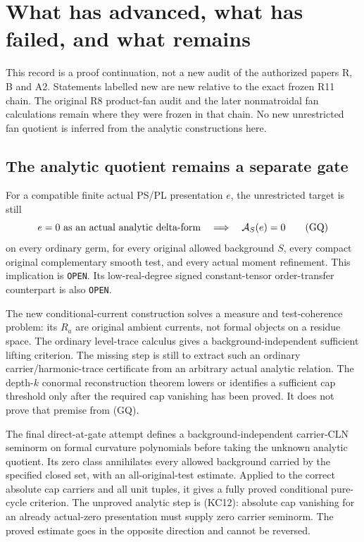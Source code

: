 \documentclass[11pt,a4paper]{article}
\numberwithin{equation}{section}
\theoremstyle{definition}
\theoremstyle{remark}
\begin{document}


\section{What has advanced, what has failed, and what remains}
\label{sec:r12-final-status}

This record is a proof continuation, not a new audit of the
authorized papers R, B and A2. Statements labelled new are new
relative to the exact frozen R11 chain. The original R8 product-fan
audit and the later nonmatroidal fan calculations remain where
they were frozen in that chain. No new unrestricted fan quotient
is inferred from the analytic constructions here.

\subsection{The analytic quotient remains a separate gate}

For a compatible finite actual PS/PL presentation $e$, the
unrestricted target is still
\[
 e=0\ \hbox{as an actual analytic delta-form}
       \quad\Longrightarrow\quad \mathcal A_S(e)=0
 \tag{GQ}
\]
on every ordinary germ, for every original allowed background $S$,
every compact original complementary smooth test, and every actual
moment refinement. This implication is \texttt{OPEN}. Its
low-real-degree signed constant-tensor order-transfer counterpart
is also \texttt{OPEN}.

The new conditional-current construction solves a measure and
test-coherence problem: its $R_a$ are original ambient currents,
not formal objects on a residue space. The ordinary level-trace
calculus gives a background-independent sufficient lifting
criterion. The missing step is still to extract such an ordinary
carrier/harmonic-trace certificate from an arbitrary actual
analytic relation. The depth-$k$ conormal reconstruction theorem
lowers or identifies a sufficient cap threshold only after the
required cap vanishing has been proved. It does not prove that
premise from (GQ).

The final direct-at-gate attempt defines a background-independent
carrier-CLN seminorm on formal curvature polynomials before taking
the unknown analytic quotient. Its zero class annihilates every
allowed background carried by the specified closed set, with an
all-original-test estimate. Applied to the correct absolute cap
carriers and all unit tuples, it gives a fully proved conditional
pure-cycle criterion. The unproved analytic step is (KC12):
absolute cap vanishing for an already actual-zero presentation
must supply zero carrier seminorm. The proved estimate goes in
the opposite direction and cannot be reversed.
\end{document}
